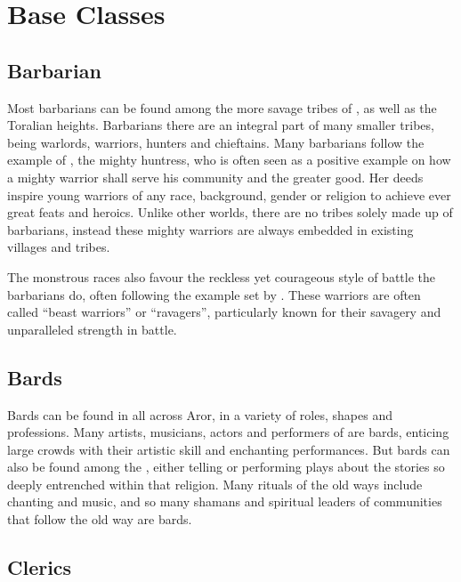 \section{Base Classes}
\label{sec:Base Classes}

\subsection{Barbarian}
\label{sec:Barbarian}

Most barbarians can be found among the more savage tribes of
,  as well as the Toralian
heights. Barbarians there are an integral part of many smaller tribes, being
warlords, warriors, hunters and chieftains. Many barbarians follow the example
of , the mighty huntress, who is often seen as a positive
example on how a mighty warrior shall serve his community and the greater
good. Her deeds inspire young warriors of any race, background, gender or
religion to achieve ever great feats and heroics. Unlike other worlds, there
are no tribes solely made up of barbarians, instead these mighty warriors are
always embedded in existing villages and tribes.

The monstrous races also favour the reckless yet courageous style of battle
the barbarians do, often following the example set by .
These warriors are often called ``beast warriors'' or ``ravagers'', particularly
known for their savagery and unparalleled strength in battle.

\subsection{Bards}
\label{sec:Bards}

Bards can be found in all across Aror, in a variety of roles, shapes and
professions. Many artists, musicians, actors and performers of
 are bards, enticing large crowds with their artistic
skill and enchanting performances. But bards can also be found among the
, either telling or performing plays about the stories
so deeply entrenched within that religion. Many rituals of the old ways
include chanting and music, and so many shamans and spiritual leaders of
communities that follow the old way are bards.

\subsection{Clerics}
\label{sec:Clerics}

